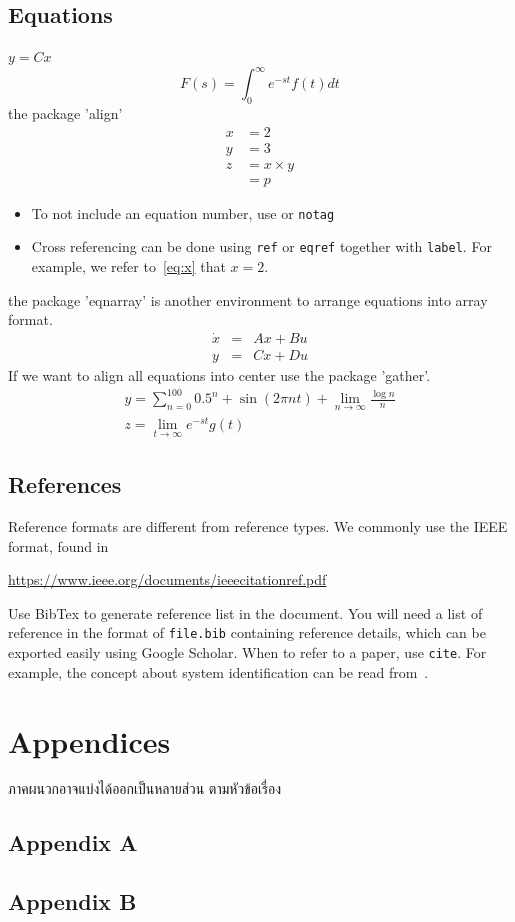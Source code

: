\documentclass[11pt,a4paper]{article}
\begin{document}
\subsection{Equations}
$y=Cx$
\begin{equation}
	F(s) = \int_0^\infty e^{-st} f(t) dt
\end{equation}
the package 'align'
\begin{align}
    x    &= 2 \label{eq:x} \\
    y    &= 3 \label{eq:y} \\
    z    &= x \times y \nonumber \\
        &= p \label{eq:results}
\end{align}
\begin{itemize}
\item To not include an equation number, use \texttt{\nonumber} or \texttt{notag} 
\item Cross referencing can be done using \texttt{ref} or \texttt{eqref} together with \texttt{label}. For example, we refer to~\eqref{eq:x} that $x=2$.
\end{itemize}
the package 'eqnarray' is another environment to arrange equations into array format.
\begin{eqnarray}
\dot{x} &=& Ax + Bu \\
y &=& Cx+Du
\end{eqnarray}
If we want to align all equations into center use the package 'gather'.
\begin{gather}
y = \sum_{n=0}^100 0.5^n + \sin(2\pi n t) + \lim_{n \rightarrow \infty} \frac{\log n}{n} \\
z = \lim_{t \rightarrow \infty} e^{-st} g(t) 
\end{gather}

\subsection{References}
Reference formats are different from reference types. We commonly use the IEEE format, found in 

\url{https://www.ieee.org/documents/ieeecitationref.pdf}

Use BibTex to generate reference list in the document. You will need a list of reference in the format of \texttt{file.bib} containing reference details, which can be exported easily using Google Scholar. When to refer to a paper, use \texttt{cite}. For example, the concept about system identification can be read from~\cite{SoS:89}.




\section{Appendices}
ภาคผนวกอาจแบ่งได้ออกเป็นหลายส่วน ตามหัวข้อเรื่อง
\subsection{Appendix A}

\subsection{Appendix B}
\end{document}
